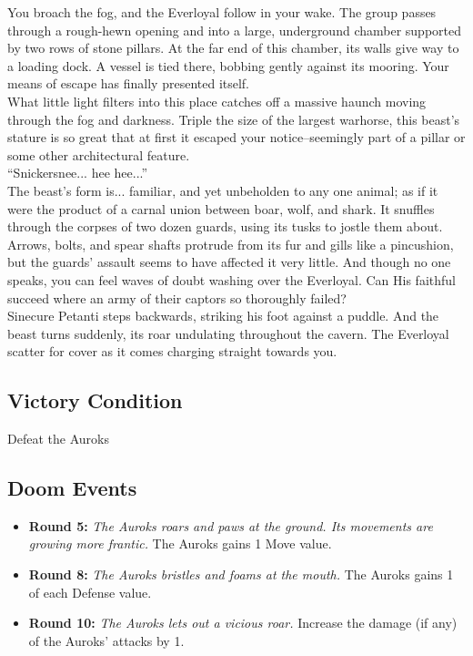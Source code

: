 You broach the fog, and the Everloyal follow in your wake. The group passes through a rough-hewn opening and into a large, underground chamber supported by two rows of stone pillars. At the far end of this chamber, its walls give way to a loading dock. A vessel is tied there, bobbing gently against its mooring. Your means of escape has finally presented itself.\\

What little light filters into this place catches off a massive haunch moving through the fog and darkness. Triple the size of the largest warhorse, this beast’s stature is so great that at first it escaped your notice--seemingly part of a pillar or some other architectural feature.\\

“Snickersnee... hee hee...”\\

The beast's form is... familiar, and yet unbeholden to any one animal; as if it were the product of a carnal union between boar, wolf, and shark. It snuffles through the corpses of two dozen guards, using its tusks to jostle them about. Arrows, bolts, and spear shafts protrude from its fur and gills like a pincushion, but the guards’ assault seems to have affected it very little. And though no one speaks, you can feel waves of doubt washing over the Everloyal. Can His faithful succeed where an army of their captors so thoroughly failed?\\

Sinecure Petanti steps backwards, striking his foot against a puddle. And the beast turns suddenly, its roar undulating throughout the cavern. The Everloyal scatter for cover as it comes charging straight towards you.

\subsection*{Victory Condition}
Defeat the Auroks

\subsection*{Doom Events}
\begin{itemize}
\item \textbf{Round 5:} \emph{The Auroks roars and paws at the ground. Its movements are growing more frantic.} The Auroks gains 1 Move value.
\item \textbf{Round 8:} \emph{The Auroks bristles and foams at the mouth.} The Auroks gains 1 of each Defense value.
\item \textbf{Round 10:} \emph{The Auroks lets out a vicious roar.} Increase the damage (if any) of the Auroks’ attacks by 1.
\end{itemize}

